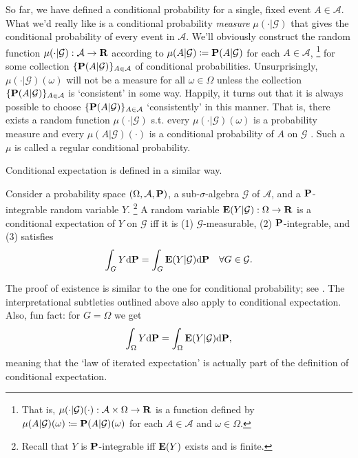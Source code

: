 \documentclass[11pt,letterpaper,reqno,oneside]{article}
\begin{document}
So far, we have defined a conditional probability for a single, fixed event $A \in \mathcal{A}$. What we'd really like is a conditional probability \emph{measure} $\mu(\cdot|\mathcal{G})$ that gives the conditional probability of every event in $\mathcal{A}$. We'll obviously construct the random function $\mu(\cdot|\mathcal{G}) : \mathcal{A} \to \mathbf{R}$ according to $\mu(A|\mathcal{G}) \coloneqq \mathbf{P}(A|\mathcal{G})$ for each $A \in \mathcal{A}$,%
	\footnote{That is, $\mu(\cdot|\mathcal{G})(\cdot) : \mathcal{A} \times \Omega \to \mathbf{R}$ is a function defined by $\mu(A|\mathcal{G})(\omega) \coloneqq \mathbf{P}(A|\mathcal{G})(\omega)$ for each $A \in \mathcal{A}$ and $\omega \in \Omega$.}
for some collection $\{ \mathbf{P}(A|\mathcal{G}) \}_{A \in \mathcal{A}}$ of conditional probabilities. Unsurprisingly, $\mu(\cdot|\mathcal{G})(\omega)$ will not be a measure for all $\omega \in \Omega$ unless the collection $\{ \mathbf{P}(A|\mathcal{G}) \}_{A \in \mathcal{A}}$ is `consistent' in some way. Happily, it turns out that it is always possible to choose $\{ \mathbf{P}(A|\mathcal{G}) \}_{A \in \mathcal{A}}$ `consistently' in this manner. That is, there exists a random function $\mu(\cdot|\mathcal{G})$ s.t. every $\mu(\cdot|\mathcal{G})(\omega)$ is a probability measure and every $\mu(A|\mathcal{G})(\cdot)$ is a conditional probability of $A$ on $\mathcal{G}$ \parencite[][Theorem 33.3]{Billingsley1995}. Such a $\mu$ is called a regular conditional probability.


Conditional expectation is defined in a similar way.
%
\begin{definition}
	Consider a probability space $(\Omega,\mathcal{A},\mathbf{P})$, a sub-$\sigma$-algebra $\mathcal{G}$ of $\mathcal{A}$, and a $\mathbf{P}$-integrable random variable $Y$.%
		\footnote{Recall that $Y$ is $\mathbf{P}$-integrable iff $\mathbf{E}(Y)$ exists and is finite.}
	A random variable $\mathbf{E}(Y|\mathcal{G}) : \Omega \to \mathbf{R}$ is a conditional expectation of $Y$ on $\mathcal{G}$ iff it is (1) $\mathcal{G}$-measurable, (2) $\mathbf{P}$-integrable, and (3) satisfies
	\begin{equation*}
		\int_G Y \mathrm{d} \mathbf{P}
		= \int_G \mathbf{E}(Y|\mathcal{G}) \mathrm{d} \mathbf{P} 
		\quad\forall G \in \mathcal{G} .
	\end{equation*}
\end{definition}

The proof of existence is similar to the one for conditional probability; see \textcite[][Proposition 13.1.7]{Rosenthal2006}. The interpretational subtleties outlined above also apply to conditional expectation. Also, fun fact: for $G=\Omega$ we get
%
\begin{equation*}
	\int_\Omega Y \mathrm{d} \mathbf{P} = \int_\Omega \mathbf{E}(Y|\mathcal{G}) \mathrm{d} \mathbf{P} ,
\end{equation*}
%
meaning that the `law of iterated expectation' is actually part of the definition of conditional expectation.
\end{document}
